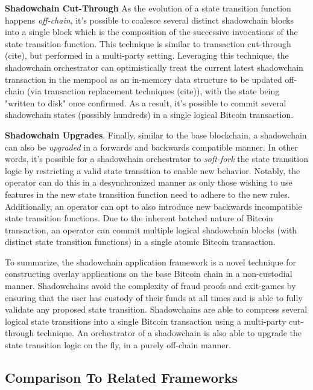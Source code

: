 \documentclass[10pt,a4paper]{article}
\theoremstyle{definition}
\begin{document}
\textbf{Shadowchain Cut-Through} As the evolution of a state transition
function happens \emph{off-chain}, it's possible to coalesce several distinct
shadowchain blocks into a single block which is the composition of the
successive invocations of the state transition function. This technique is
similar to transaction cut-through (cite), but performed in a multi-party
setting. Leveraging this technique, the shadowchain orchestrator can optimistically
treat the current latest shadowchain transaction in the mempool as an in-memory
data structure to be updated off-chain (via transaction replacement techniques
(cite)), with the state being "written to disk" once confirmed. As a result,
it's possible to commit several shadowchain states (possibly hundreds) in a
single logical Bitcoin transaction.

\textbf{Shadowchain Upgrades}. Finally, similar to the base blockchain, a
shadowchain can also be \emph{upgraded} in a forwards and backwards compatible
manner. In other words, it's possible for a shadowchain orchestrator to
\emph{soft-fork} the state transition logic by restricting a valid state
transition to enable new behavior. Notably, the operator can do this in a
desynchronized manner as only those wishing to use features in the new state
transition function need to adhere to the new rules. Additionally, an operator
can opt to also introduce new backwards incompatible state transition functions.
Due to the inherent batched nature of Bitcoin transaction, an operator can
commit multiple logical shadowchain blocks (with distinct state transition
functions) in a single atomic Bitcoin transaction.

To summarize, the shadowchain application framework is a novel technique for
constructing overlay applications on the base Bitcoin chain in a non-custodial
manner. Shadowchains avoid the complexity of fraud proofs and exit-games by
ensuring that the user has custody of their funds at all times and is able to
fully validate any proposed state transition. Shadowchains are able to compress
several logical state transitions into a single Bitcoin transaction using a
multi-party cut-through technique. An orchestrator of a shadowchain is also
able to upgrade the state transition logic on the fly, in a purely off-chain
manner.


\subsection{Comparison To Related Frameworks}
\end{document}
